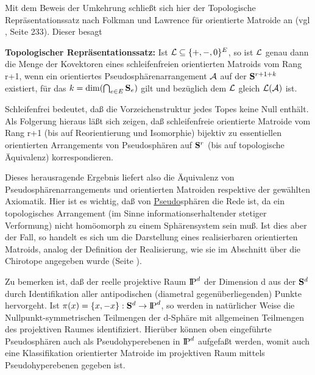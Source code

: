 Mit dem Beweis der Umkehrung schließt sich hier der Topologische
Repräsentationssatz nach Folkman und Lawrence für orientierte Matroide an
(vgl \cite{Bj:93}, Seite 233). Dieser besagt
\begin{satz}
{\bf Topologischer Repräsentationssatz:} Ist ${\cal L}\subseteq\{+,-,0\}^E$, so
ist $\cal L$ genau dann die Menge der Kovektoren eines schleifenfreien
orientierten Matroids vom Rang r+1, wenn ein orientiertes
Pseudosphärenarrangement $\cal A$ auf der $\S^{r+1+k}$ existiert, für das
$k=\mbox{dim}(\Cap_{e\in E}\S_e)$ gilt und bezüglich dem $\cal L$ gleich
$\cal L(A)$ ist.
\end{satz}

Schleifenfrei bedeutet, daß die Vorzeichenstruktur jedes Topes keine Null
enthält. Als Folgerung hieraus läßt sich zeigen, daß schleifenfreie
orientierte Matroide vom Rang r+1 (bis auf Reorientierung und Isomorphie)
bijektiv zu essentiellen orientierten Arrangements von Pseudosphären auf
$\S^r$ (bis auf topologische Äquivalenz) korrespondieren.

Dieses herausragende Ergebnis liefert also die Äquivalenz von
Pseudosphärenarrangements und orientierten Matroiden respektive der gewählten
Axiomatik. Hier ist es wichtig, daß von \ul{Pseu\-do}\-sphären die Rede ist,
da ein topologisches Arrangement (im Sinne informationserhaltender stetiger
Verformung) nicht homöomorph zu einem Sphärensystem sein muß.
Ist dies aber der Fall, so handelt es sich um die Darstellung eines
realisierbaren orientierten Matroids, analog der Definition der Realisierung,
wie sie im Abschnitt über die Chirotope angegeben wurde (Seite \pageref{real}).

Zu bemerken ist, daß der reelle projektive Raum $\P^d$ der Dimension d aus
der $\S^d$ durch Identifikation aller antipodischen (diametral
gegenüberliegenden) Punkte hervorgeht. Ist $\pi(x)=\{x,-x\}:\S^d\to \P^d$,
so werden in natürlicher Weise die Nullpunkt-symmetrischen Teilmengen
der d-Sphäre mit allgemeinen Teilmengen des projektiven Raumes
identifiziert. Hierüber können oben eingeführte Pseudosphären auch als
Pseudohyperebenen in $\P^d$ aufgefaßt werden, womit auch eine Klassifikation
orientierter Matroide im projektiven Raum mittels Pseudohyperebenen gegeben ist.

